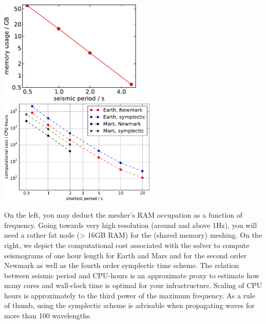 \documentclass{article}
\begin{document}
\begin{center}
    \includegraphics[height=50mm]{memory_usage_new.pdf}
    \hspace{5mm}
    \includegraphics[height=50mm]{db_generation_cost.pdf}
\end{center}

On the left, you may deduct the mesher's RAM occupation as a function of frequency. Going
towards very high resolution (around and above 1Hz), you will need a rather fat node (>
16GB RAM) for the (shared memory) meshing.
On the right, we depict the computational cost
associated with the solver to compute seismograms of one hour length for Earth and Mars
and for the second order Newmark as well as the fourth order symplectic time scheme. The
relation between seismic period and CPU-hours is an approximate proxy to estimate how many
cores and wall-clock time is optimal for your infrastructure. Scaling of CPU hours is
approximately to the third power of the maximum frequency. As a rule of thumb, using the
symplectic scheme is advisable when propagating waves for more than 100 wavelengths.
\end{document}
